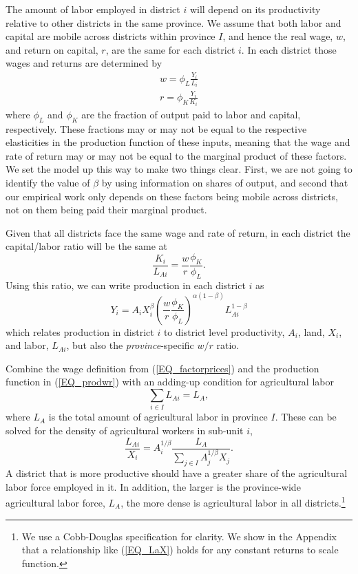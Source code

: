 \documentclass[11pt]{article}
\begin{document}
The amount of labor employed in district $i$ will depend on its productivity relative to other districts in the same province. We assume that both labor and capital are mobile across districts within province $I$, and hence the real wage, $w$, and return on capital, $r$, are the same for each district $i$. In each district those wages and returns are determined by
\begin{eqnarray}
    w = \phi_L \frac{Y_i}{L_i} \\ \nonumber
    r = \phi_K \frac{Y_i}{K_i} \label{EQ_factorprices}
\end{eqnarray}
where $\phi_L$ and $\phi_K$ are the fraction of output paid to labor and capital, respectively. These fractions may or may not be equal to the respective elasticities in the production function of these inputs, meaning that the wage and rate of return may or may not be equal to the marginal product of these factors. We set the model up this way to make two things clear. First, we are not going to identify the value of $\beta$ by using information on shares of output, and second that our empirical work only depends on these factors being mobile across districts, not on them being paid their marginal product.

Given that all districts face the same wage and rate of return, in each district the capital/labor ratio will be the same at
\begin{equation}
    \frac{K_i}{L_{Ai}} = \frac{w}{r}\frac{\phi_K}{\phi_L}. \nonumber
\end{equation}
Using this ratio, we can write production in each district $i$ as
\begin{equation}
Y_{i} = A_{i} X_{i}^{\beta} \left(\frac{w}{r}\frac{\phi_K}{\phi_L}\right)^{\alpha(1-\beta)} L_{Ai}^{1-\beta} \label{EQ_prodwr}
\end{equation}
which relates production in district $i$ to district level productivity, $A_i$, land, $X_i$, and labor, $L_{Ai}$, but also the \textit{province}-specific $w/r$ ratio.

Combine the wage definition from (\ref{EQ_factorprices}) and the production function in (\ref{EQ_prodwr}) with an adding-up condition for agricultural labor 
\begin{equation}
\sum_{i\in I} L_{Ai} = L_A, \nonumber
\end{equation}
where $L_A$ is the total amount of agricultural labor in province $I$. These can be solved for the density of agricultural workers in sub-unit $i$,
\begin{equation}
\frac{L_{Ai}}{X_i} = A_{i}^{1/\beta}\frac{L_A}{\sum_{j\in I} A_{j}^{1/\beta}X_{j}}. \label{EQ_LaX}
\end{equation}
A district that is more productive should have a greater share of the agricultural labor force employed in it. In addition, the larger is the province-wide agricultural labor force, $L_A$, the more dense is agricultural labor in all districts.\footnote{We use a Cobb-Douglas specification for clarity. We show in the Appendix that a relationship like (\ref{EQ_LaX}) holds for any constant returns to scale function.} 
\end{document}
